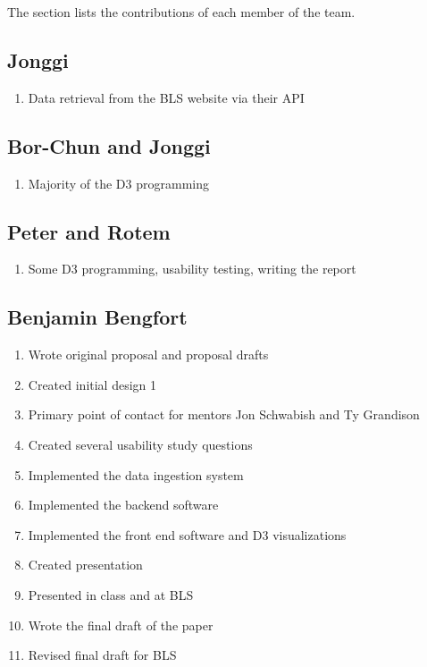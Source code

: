\documentclass{sigchi}
\begin{document}
The section lists the contributions of each member of the team.

\subsection{Jonggi}

\begin{enumerate}
	\item Data retrieval from the BLS website via their API
\end{enumerate}

\subsection{Bor-Chun and Jonggi}

\begin{enumerate}
	\item Majority of the D3 programming
\end{enumerate}

\subsection{Peter and Rotem}

\begin{enumerate}
	\item Some D3 programming, usability testing, writing the report
\end{enumerate}

\subsection{Benjamin Bengfort}

\begin{enumerate}
    \item Wrote original proposal and proposal drafts
    \item Created initial design 1
    \item Primary point of contact for mentors Jon Schwabish and Ty Grandison
    \item Created several usability study questions
    \item Implemented the data ingestion system
    \item Implemented the backend software
    \item Implemented the front end software and D3 visualizations
    \item Created presentation
    \item Presented in class and at BLS
    \item Wrote the final draft of the paper
    \item Revised final draft for BLS
\end{enumerate}
\end{document}
